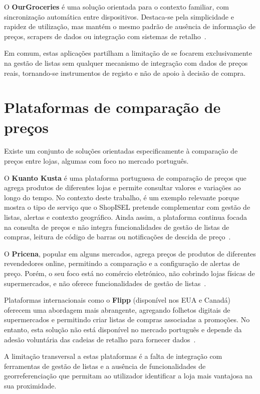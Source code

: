 O \textbf{OurGroceries} é uma solução orientada para o contexto familiar, com sincronização automática entre dispositivos. Destaca-se pela simplicidade e rapidez de utilização, mas mantém o mesmo padrão de ausência de informação de preços, scrapers de dados ou integração com sistemas de retalho~\cite{ourgroceries-app}.

Em comum, estas aplicações partilham a limitação de se focarem exclusivamente na gestão de listas sem qualquer mecanismo de integração com dados de preços reais, tornando-se instrumentos de registo e não de apoio à decisão de compra.

\section{Plataformas de comparação de preços}
\label{sec:3.2}

Existe um conjunto de soluções orientadas especificamente à comparação de preços entre lojas, algumas com foco no mercado português.

O \textbf{Kuanto Kusta} é uma plataforma portuguesa de comparação de preços que agrega produtos de diferentes lojas e permite consultar valores e variações ao longo do tempo. No contexto deste trabalho, é um exemplo relevante porque mostra o tipo de serviço que o ShopISEL pretende complementar com gestão de listas, alertas e contexto geográfico. Ainda assim, a plataforma continua focada na consulta de preços e não integra funcionalidades de gestão de listas de compras, leitura de código de barras ou notificações de descida de preço~\cite{kuantokusta}.

O \textbf{Pricena}, popular em alguns mercados, agrega preços de produtos de diferentes revendedores online, permitindo a comparação e a configuração de alertas de preço. Porém, o seu foco está no comércio eletrónico, não cobrindo lojas físicas de supermercados, e não oferece funcionalidades de gestão de listas~\cite{pricena}.

Plataformas internacionais como o \textbf{Flipp} (disponível nos EUA e Canadá) oferecem uma abordagem mais abrangente, agregando folhetos digitais de supermercados e permitindo criar listas de compras associadas a promoções. No entanto, esta solução não está disponível no mercado português e depende da adesão voluntária das cadeias de retalho para fornecer dados~\cite{flipp-app}.

A limitação transversal a estas plataformas é a falta de integração com ferramentas de gestão de listas e a ausência de funcionalidades de georreferenciação que permitam ao utilizador identificar a loja mais vantajosa na sua proximidade.

